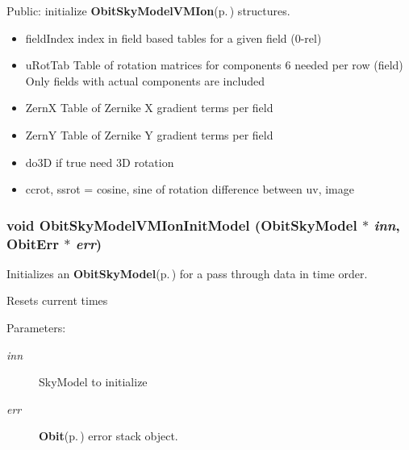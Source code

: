 Public: initialize {\bf Obit\-Sky\-Model\-VMIon}{\rm (p.\,\pageref{structObitSkyModelVMIon})} structures. 

\begin{itemize}
\item field\-Index index in field based tables for a given field (0-rel) \item u\-Rot\-Tab Table of rotation matrices for components 6 needed per row (field) Only fields with actual components are included \item Zern\-X Table of Zernike X gradient terms per field \item Zern\-Y Table of Zernike Y gradient terms per field \item do3D if true need 3D rotation \item ccrot, ssrot = cosine, sine of rotation difference between uv, image 
\end{itemize}
\subsubsection{\setlength{\rightskip}{0pt plus 5cm}void Obit\-Sky\-Model\-VMIon\-Init\-Model ({\bf Obit\-Sky\-Model} $\ast$ {\em inn}, {\bf Obit\-Err} $\ast$ {\em err})}\label{ObitSkyModelVMIon_8c_a14}


Initializes an {\bf Obit\-Sky\-Model}{\rm (p.\,\pageref{structObitSkyModel})} for a pass through data in time order. 

Resets current times \begin{Desc}
\item[Parameters:]
\begin{description}
\item[{\em inn}]Sky\-Model to initialize \item[{\em err}]{\bf Obit}{\rm (p.\,\pageref{structObit})} error stack object. \end{description}
\end{Desc}
